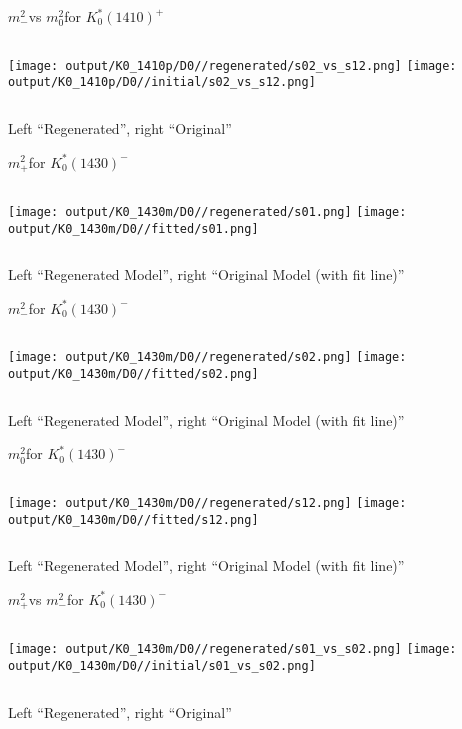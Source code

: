 \documentclass{beamer}
\newcommand{\MP}{\ensuremath{m^2_+}}
\newcommand{\MM}{\ensuremath{m^2_-}}
\newcommand{\MZ}{\ensuremath{m^2_0}}
\begin{document}
\begin{frame}{\MM vs \MZ for $K_0^*(1410)^+$}
\begin{columns}[t]
\centering
\texttt{[image: output/K0\_1410p/D0//regenerated/s02\_vs\_s12.png]}
\centering
\texttt{[image: output/K0\_1410p/D0//initial/s02\_vs\_s12.png]}
\end{columns}
    \centering
    Left ``Regenerated'', right ``Original''
\end{frame} 

\begin{frame}{\MP for $K_0^*(1430)^-$}
\begin{columns}[t]
\centering
\texttt{[image: output/K0\_1430m/D0//regenerated/s01.png]}
\centering
\texttt{[image: output/K0\_1430m/D0//fitted/s01.png]}
\end{columns}
    \centering
    Left ``Regenerated Model'', right ``Original Model (with fit line)''
\end{frame}                   

\begin{frame}{\MM for $K_0^*(1430)^-$}
\begin{columns}[t]
\centering
\texttt{[image: output/K0\_1430m/D0//regenerated/s02.png]}
\centering
\texttt{[image: output/K0\_1430m/D0//fitted/s02.png]}
\end{columns}
    \centering
    Left ``Regenerated Model'', right ``Original Model (with fit line)''
\end{frame}                   

\begin{frame}{\MZ for $K_0^*(1430)^-$}
\begin{columns}[t]
\centering
\texttt{[image: output/K0\_1430m/D0//regenerated/s12.png]}
\centering
\texttt{[image: output/K0\_1430m/D0//fitted/s12.png]}
\end{columns}
    \centering
    Left ``Regenerated Model'', right ``Original Model (with fit line)''
\end{frame}                   


\begin{frame}{\MP vs \MM for $K_0^*(1430)^-$}
\begin{columns}[t]
\centering
\texttt{[image: output/K0\_1430m/D0//regenerated/s01\_vs\_s02.png]}
\centering
\texttt{[image: output/K0\_1430m/D0//initial/s01\_vs\_s02.png]}
\end{columns}
    \centering
    Left ``Regenerated'', right ``Original''
\end{frame} 
\end{document}
